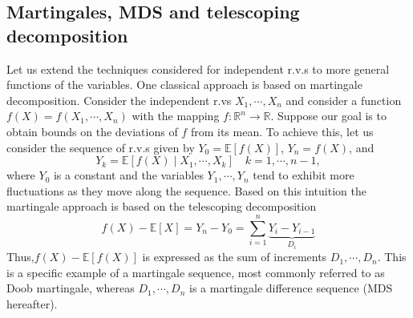 \documentclass[10pt,handout,english]{beamer}
\newcommand{\E}{\mathbb{E}}
\newcommand{\R}{\mathbb{R}}
\begin{document}
\subsection{Martingales, MDS and telescoping decomposition}

\begin{frame}[allowframebreaks]
Let us extend the techniques considered for independent r.v.s to more general functions of the variables. One classical approach is based on martingale decomposition. Consider the independent r.vs $X_1,\cdots,X_n$ and consider a function $f(X)=f(X_1,\cdots,X_n)$ with the mapping $f:\R^n\to\R$. Suppose our goal is to obtain bounds on the deviations of $f$ from its mean. To achieve this, let us consider the sequence of r.v.s given by $Y_0=\E[f(X)]$, $Y_n=f(X)$, and
\[
Y_k=\E[f(X)\mid X_1,\cdots,X_k]\quad k=1,\cdots,n-1,
\]
where $Y_0$ is a constant and the variables $Y_1,\cdots,Y_n$ tend to exhibit more fluctuations as they move along the sequence. Based on this intuition the martingale approach is based on the telescoping decomposition 
\[
f(X)-\E[X]=Y_n-Y_0=\sum\limits_{i=1}^n\underbrace{Y_i-Y_{i-1}}_{D_i}
\]
Thus,$f(X)-\E[f(X)]$ is expressed as the sum of increments $D_1,\cdots,D_n$. This is a specific example of a martingale sequence, most commonly referred to as Doob martingale, whereas $D_{1},\cdots,D_n$ is a martingale difference sequence (MDS hereafter).


\end{frame}
\end{document}
